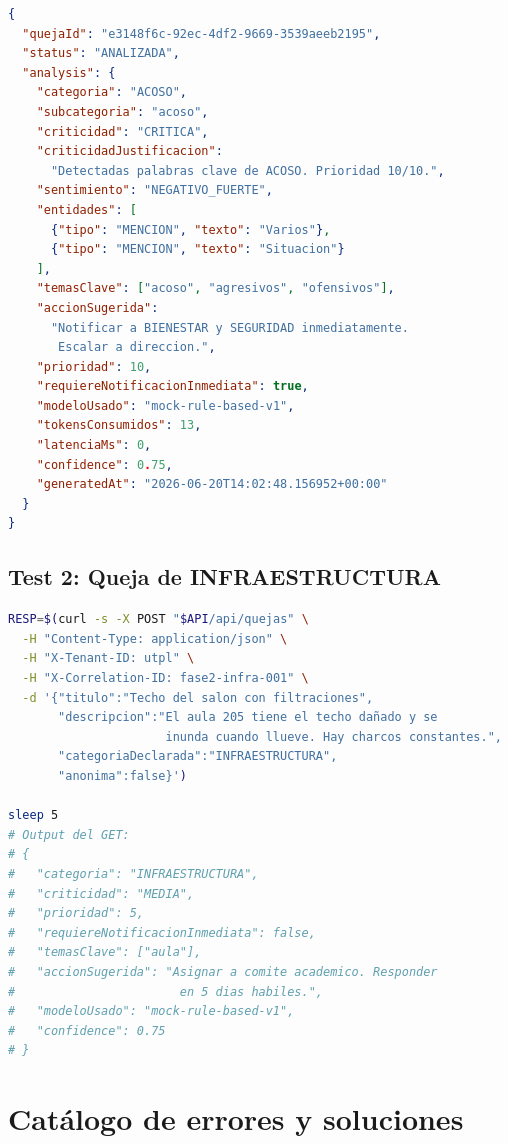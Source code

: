 \documentclass[11pt,a4paper,oneside]{article}
\begin{document}
\begin{lstlisting}[language=json,caption={Output del GET --- analysis detectada}]
{
  "quejaId": "e3148f6c-92ec-4df2-9669-3539aeeb2195",
  "status": "ANALIZADA",
  "analysis": {
    "categoria": "ACOSO",
    "subcategoria": "acoso",
    "criticidad": "CRITICA",
    "criticidadJustificacion":
      "Detectadas palabras clave de ACOSO. Prioridad 10/10.",
    "sentimiento": "NEGATIVO_FUERTE",
    "entidades": [
      {"tipo": "MENCION", "texto": "Varios"},
      {"tipo": "MENCION", "texto": "Situacion"}
    ],
    "temasClave": ["acoso", "agresivos", "ofensivos"],
    "accionSugerida":
      "Notificar a BIENESTAR y SEGURIDAD inmediatamente.
       Escalar a direccion.",
    "prioridad": 10,
    "requiereNotificacionInmediata": true,
    "modeloUsado": "mock-rule-based-v1",
    "tokensConsumidos": 13,
    "latenciaMs": 0,
    "confidence": 0.75,
    "generatedAt": "2026-06-20T14:02:48.156952+00:00"
  }
}
\end{lstlisting}

\subsection{Test 2: Queja de INFRAESTRUCTURA}

\begin{lstlisting}[language=bash,caption={Test E2E: INFRAESTRUCTURA}]
RESP=$(curl -s -X POST "$API/api/quejas" \
  -H "Content-Type: application/json" \
  -H "X-Tenant-ID: utpl" \
  -H "X-Correlation-ID: fase2-infra-001" \
  -d '{"titulo":"Techo del salon con filtraciones",
       "descripcion":"El aula 205 tiene el techo dañado y se
                      inunda cuando llueve. Hay charcos constantes.",
       "categoriaDeclarada":"INFRAESTRUCTURA",
       "anonima":false}')

sleep 5
# Output del GET:
# {
#   "categoria": "INFRAESTRUCTURA",
#   "criticidad": "MEDIA",
#   "prioridad": 5,
#   "requiereNotificacionInmediata": false,
#   "temasClave": ["aula"],
#   "accionSugerida": "Asignar a comite academico. Responder
#                       en 5 dias habiles.",
#   "modeloUsado": "mock-rule-based-v1",
#   "confidence": 0.75
# }
\end{lstlisting}

\section{Cat\'alogo de errores y soluciones}
\end{document}
